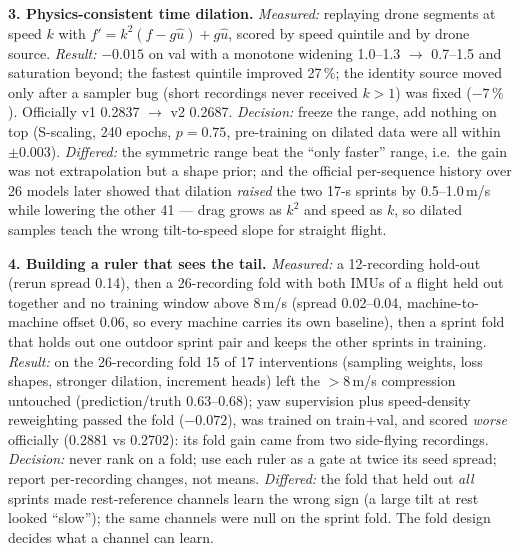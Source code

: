 \documentclass[letterpaper,10pt,conference]{ieeeconf}
\begin{document}
\textbf{3. Physics-consistent time dilation.} \emph{Measured:} replaying drone segments at speed
$k$ with $f'=k^2(f-g\hat u)+g\hat u$, scored by speed quintile and by drone source.
\emph{Result:} $-0.015$ on val with a monotone widening 1.0--1.3 $\to$ 0.7--1.5 and saturation
beyond; the fastest quintile improved 27\,\%; the identity source moved only after a sampler bug
(short recordings never received $k>1$) was fixed ($-7\,\%$). Officially v1 0.2837 $\to$ v2 0.2687.
\emph{Decision:} freeze the range, add nothing on top (S-scaling, 240 epochs, $p=0.75$,
pre-training on dilated data were all within $\pm0.003$). \emph{Differed:} the symmetric range
beat the ``only faster'' range, i.e.\ the gain was not extrapolation but a shape prior; and the
official per-sequence history over 26 models later showed that dilation \emph{raised} the two
17-s sprints by 0.5--1.0\,m/s while lowering the other 41 --- drag grows as $k^2$ and speed as $k$,
so dilated samples teach the wrong tilt-to-speed slope for straight flight.

\textbf{4. Building a ruler that sees the tail.} \emph{Measured:} a 12-recording hold-out
(rerun spread 0.14), then a 26-recording fold with both IMUs of a flight held out together and no
training window above 8\,m/s (spread 0.02--0.04, machine-to-machine offset 0.06, so every machine
carries its own baseline), then a sprint fold that holds out one outdoor sprint pair and keeps the
other sprints in training. \emph{Result:} on the 26-recording fold 15 of 17 interventions
(sampling weights, loss shapes, stronger dilation, increment heads) left the $>8$\,m/s compression
untouched (prediction/truth 0.63--0.68); yaw supervision plus speed-density reweighting passed the
fold ($-0.072$), was trained on train+val, and scored \emph{worse} officially (0.2881 vs 0.2702):
its fold gain came from two side-flying recordings. \emph{Decision:} never rank on a fold; use
each ruler as a gate at twice its seed spread; report per-recording changes, not means.
\emph{Differed:} the fold that held out \emph{all} sprints made rest-reference channels learn the
wrong sign (a large tilt at rest looked ``slow''); the same channels were null on the sprint fold.
The fold design decides what a channel can learn.
\end{document}
